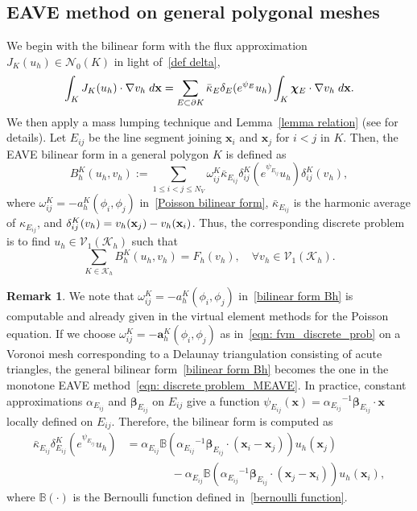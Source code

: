 \documentclass[a4paper]{article}
\theoremstyle{plain}
\theoremstyle{definition}
\newtheorem{remark}[theorem]{Remark}
\numberwithin{equation}{section}
\newcommand{\bx}{{\bf x}}
\begin{document}
\subsection{EAVE method on general polygonal meshes}
We begin with the bilinear form with the flux approximation $J_K(u_h)\in\mathcal{N}_0(K)$ in light of~\eqref{def delta},
\begin{equation}
\int_K J_K(u_h)\cdot\nabla v_h\;{\rm d}\mathbf{x}=\sum_{E\subset \partial K}\bar{\kappa}_E\delta_E(e^{\psi_E}u_h)\int_K \bm{\chi}_E\cdot\nabla v_h\;{\rm d}\mathbf{x}.\label{bilinear form Bbar}
\end{equation}
We then apply a mass lumping technique and Lemma~\ref{lemma relation} (see \cite{lee2021edge} for details). 
Let $E_{ij}$ be the line segment joining $\mathbf{x}_i$ and $\mathbf{x}_j$ for $i<j$ in $K$.
Then, the EAVE bilinear form in a general polygon $K$ is defined as
\begin{equation}
B_h^K(u_h,v_h) := \sum_{1\leq i<j\leq N_V} \omega_{ij}^K\bar{\kappa}_{E_{ij}}\delta_{ij}^K(e^{\psi_{E_{ij}}} u_h)\delta_{ij}^K(v_h),\label{bilinear form Bh}
\end{equation}
where
$\omega_{ij}^K=-a_h^K(\phi_i,\phi_j)$ in~\eqref{Poisson bilinear form}, $\bar{\kappa}_{E_{ij}}$ is the harmonic average of $\kappa_{E_{ij}}$, and $\delta_{ij}^K(v_h)=v_h(\bx_j)-v_h(\bx_i)$.
Thus, the corresponding discrete problem is to find $u_h\in \mathcal V_1(\mathcal{K}_h)$ such that
\begin{equation}
\sum_{K\in \mathcal{K}_h}B_h^K(u_h,v_h)=F_h(v_h),\quad\forall v_h\in \mathcal V_1(\mathcal{K}_h).\label{discrete problem}
\end{equation}


\begin{remark}
We note that $\omega_{ij}^K=-a_h^K(\phi_i,\phi_j)$ in~\eqref{bilinear form Bh} is computable and already given in the virtual element methods for the Poisson equation.
If we choose $\omega_{ij}^K=-\mathbf{a}_h^K(\phi_i,\phi_j)$ as in~\eqref{eqn: fvm_discrete_prob} on a Voronoi mesh corresponding to a Delaunay triangulation consisting of acute triangles, the general bilinear form~\eqref{bilinear form Bh} becomes the one in the monotone EAVE method~\eqref{eqn: discrete problem_MEAVE}.
In practice, constant approximations $\alpha_{E_{ij}}$ and $\bm{\beta}_{E_{ij}}$ on $E_{ij}$ give a function $\psi_{E_{ij}}(\mathbf{x})={\alpha_{E_{ij}}}^{-1}\bm{\beta}_{E_{ij}}\cdot\mathbf{x}$ locally defined on $E_{ij}$.
Therefore, the bilinear form is computed as
\begin{align*}
\bar{\kappa}_{E_{ij}}\delta_{E_{ij}}^K(e^{\psi_{E_{ij}}} u_h)&=\alpha_{E_{ij}} \mathbb{B}({\alpha_{E_{ij}}}^{-1}\bm{\beta}_{E_{ij}}\cdot(\mathbf{x}_{i}-\mathbf{x}_{j}))u_h(\mathbf{x}_j)\\
&\qquad\qquad-\alpha_{E_{ij}} \mathbb{B}({\alpha_{E_{ij}}}^{-1}\bm{\beta}_{E_{ij}}\cdot(\mathbf{x}_{j}-\mathbf{x}_{i}))u_{h}(\mathbf{x}_i),
\end{align*}
where $\mathbb{B}(\cdot)$ is the Bernoulli function defined in~\eqref{bernoulli function}.
\end{remark}
\end{document}
